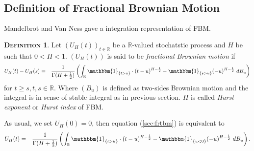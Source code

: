 \documentclass[a4paper, twoside, 11pt]{article}
\theoremstyle{definition}
\newtheorem{definition}{\scshape Definition}[section]
\newcommand{\brkt}[1]{\left({#1} \right)}
\begin{document}
\subsection{Definition of Fractional Brownian Motion}
Mandelbrot and Van Ness \cite{mandelbrot} gave a integration representation of FBM.
\begin{definition}
  Let $(U_H(t))_{t\in \mathbb{R}}$ be a $\mathbb{R}$-valued stochatstic process and $H$ be such that $0<H<1$. $(U_H(t))$ is said to be \emph{fractional Brownian motion} if 
  \begin{eqnarray}
	U_H(t) - U_H(s) &=& \frac{1}{\Gamma(H+\frac{1}{2})}\brkt{\int_{\mathbb{R}} \mathbbm{1}_{\{t > u\}}\cdot (t-u)^{H-\frac{1}{2}} - \mathbbm{1}_{\{s > u\}} (-u)^{H-\frac{1}{2}} \, \mathop{dB_u}}
	\label{sec:frtbm}
  \end{eqnarray}
  for $t\ge s, t, s \in \mathbb{R}$. Where $(B_u)$ is defined as two-sides Brownian motion and the integral is in sense of stable integral as in previous section. $H$ is called \emph{Hurst exponent} or \emph{Hurst index} of FBM.
\end{definition}

As usual, we set $U_H(0) = 0$, then equation (\ref{sec:frtbm}) is equivalent to
	 \begin{eqnarray}
	   U_H(t) &=& \frac{1}{\Gamma(H+\frac{1}{2})}\brkt{\int_{\mathbb{R}} \mathbbm{1}_{\{t > u\}}\cdot (t-u)^{H-\frac{1}{2}} - \mathbbm{1}_{\{u < 0\}} (-u)^{H-\frac{1}{2}} \, \mathop{dB_u}}.
	\label{sec:fbm}
  \end{eqnarray}
\end{document}
